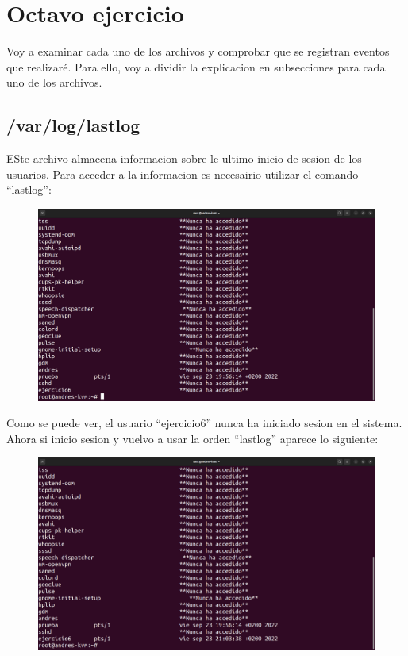 \documentclass{article}
\begin{document}
\section{Octavo ejercicio}
Voy a examinar cada uno de los archivos y comprobar que se registran eventos que realizaré. Para ello, voy a dividir la explicacion en subsecciones para cada uno de los archivos.

\subsection{/var/log/lastlog}
ESte archivo almacena informacion sobre le ultimo inicio de sesion de los usuarios. Para acceder a la informacion es necesairio utilizar el comando ``lastlog'':

\begin{figure}[H]
    \includegraphics[width=\textwidth]{imagenes/lastlogejercicio6never.png}
\end{figure}

Como se puede ver, el usuario ``ejercicio6'' nunca ha iniciado sesion en el sistema. Ahora si inicio sesion y vuelvo a usar la orden ``lastlog'' aparece lo siguiente:

\begin{figure}[H]
    \includegraphics[width=\textwidth]{imagenes/lastlogejercicio6ok.png}
\end{figure}
\end{document}
